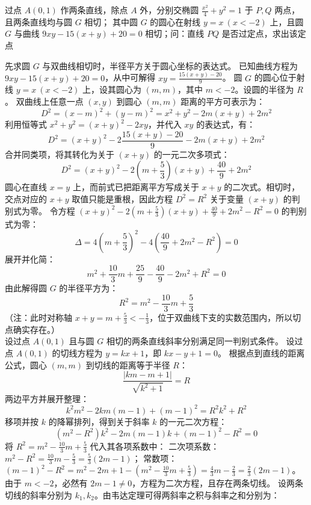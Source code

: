 \begin{example}
过点 \(A(0,1)\) 作两条直线，除点 \(A\) 外，分别交椭圆 \(\frac{x^2}{4} + y^2 = 1\) 于 \(P,Q\) 两点，且两条直线均与圆 \(G\) 相切；
其中圆 \(G\) 的圆心在射线 \(y = x\ (x < -2)\) 上，且圆 \(G\) 与曲线 \(9xy - 15(x + y) + 20 = 0\) 相切；问：直线 \(PQ\) 是否过定点，求出该定点
\end{example}
\begin{solution}
先求圆 $G$ 与双曲线相切时，半径平方关于圆心坐标的表达式。
已知曲线方程为 $9xy - 15(x + y) + 20 = 0$，从中可解得 $xy = \frac{15(x + y) - 20}{9}$。
圆 $G$ 的圆心位于射线 $y = x\ (x < -2)$ 上，设其圆心为 $(m, m)$，其中 $m < -2$。设圆的半径为 $R$。
双曲线上任意一点 $(x, y)$ 到圆心 $(m, m)$ 距离的平方可表示为：
$$ D^2 = (x - m)^2 + (y - m)^2 = x^2 + y^2 - 2m(x + y) + 2m^2 $$
利用恒等式 $x^2 + y^2 = (x + y)^2 - 2xy$，并代入 $xy$ 的表达式，有：
$$ D^2 = (x + y)^2 - 2\frac{15(x + y) - 20}{9} - 2m(x + y) + 2m^2 $$
合并同类项，将其转化为关于 $(x + y)$ 的一元二次多项式：
$$ D^2 = (x + y)^2 - 2\left(m + \frac{5}{3}\right)(x + y) + \frac{40}{9} + 2m^2 $$
圆心在直线 $x=y$ 上，而前式已把距离平方写成关于 $x+y$ 的二次式。相切时，交点对应的 $x+y$ 取值只能是重根，因此方程 $D^2=R^2$ 关于变量 $(x+y)$ 的判别式为零。
令方程 $(x + y)^2 - 2\left(m + \frac{5}{3}\right)(x + y) + \frac{40}{9} + 2m^2 - R^2 = 0$ 的判别式为零：
$$ \Delta = 4\left(m + \frac{5}{3}\right)^2 - 4\left(\frac{40}{9} + 2m^2 - R^2\right) = 0 $$
展开并化简：
$$ m^2 + \frac{10}{3}m + \frac{25}{9} - \frac{40}{9} - 2m^2 + R^2 = 0 $$
由此解得圆 $G$ 的半径平方为：
$$ R^2 = m^2 - \frac{10}{3}m + \frac{5}{3} $$
（注：此时对称轴 $x + y = m + \frac{5}{3} < -\frac{1}{3}$，位于双曲线下支的实数范围内，所以切点确实存在。）\\
设过点 $A(0,1)$ 且与圆 $G$ 相切的两条直线斜率分别满足同一判别式条件。
设过点 $A(0, 1)$ 的切线方程为 $y = kx + 1$，即 $kx - y + 1 = 0$。
根据点到直线的距离公式，圆心 $(m, m)$ 到切线的距离等于半径 $R$：
$$ \frac{|km - m + 1|}{\sqrt{k^2 + 1}} = R $$
两边平方并展开整理：
$$ k^2 m^2 - 2km(m - 1) + (m - 1)^2 = R^2 k^2 + R^2 $$
移项并按 $k$ 的降幂排列，得到关于斜率 $k$ 的一元二次方程：
$$ (m^2 - R^2)k^2 - 2m(m - 1)k + (m - 1)^2 - R^2 = 0 $$
将 $R^2 = m^2 - \frac{10}{3}m + \frac{5}{3}$ 代入其各项系数中：
二次项系数：$m^2 - R^2 = \frac{10}{3}m - \frac{5}{3} = \frac{5}{3}(2m - 1)$；
常数项：$(m - 1)^2 - R^2 = m^2 - 2m + 1 - \left(m^2 - \frac{10}{3}m + \frac{5}{3}\right) = \frac{4}{3}m - \frac{2}{3} = \frac{2}{3}(2m - 1)$。
由于 $m < -2$，必然有 $2m - 1 \neq 0$，方程为二次方程，且存在两条切线。
设两条切线的斜率分别为 $k_1, k_2$。由韦达定理可得两斜率之积与斜率之和分别为：

\end{solution}
